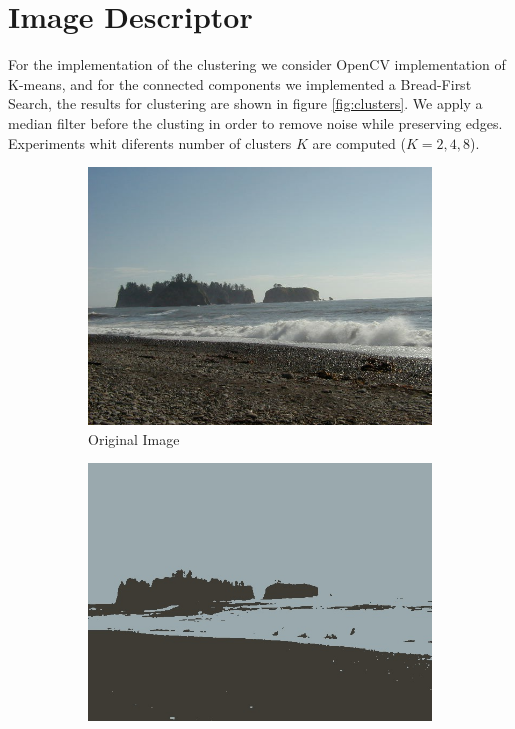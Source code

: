 \section{Image Descriptor}

For the implementation of the clustering we consider OpenCV implementation of K-means, and for the connected components we implemented a Bread-First Search, the results for clustering are shown in figure \ref{fig:clusters}. We apply a median filter before the clusting in order to remove noise while preserving edges. Experiments whit diferents number of clusters $K$ are computed ($K = 2, 4, 8$).

\begin{figure}[!h]
	\centering
	\begin{subfigure}{0.5\textwidth}
	  \centering
	  \includegraphics[width=0.9\linewidth]{figs/beach_1.jpg}
	  \caption{Original Image}
	\end{subfigure}%
	\begin{subfigure}{0.5\textwidth}
	  \centering
	  \includegraphics[width=0.9\linewidth]{figs/beach_1_clustK2.jpg}

\end{subfigure}
\end{figure}
